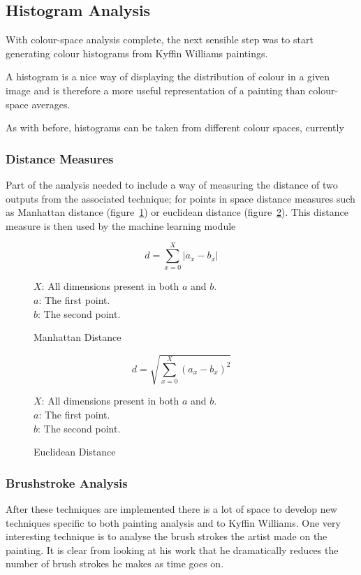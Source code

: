 \documentclass[11pt,fleqn,twoside]{article}
\begin{document}
\subsection{Histogram Analysis}
With colour-space analysis complete, the next sensible step was to start generating colour 
histograms from Kyffin Williams paintings.

A histogram is a nice way of displaying the distribution of colour in a given image and is 
therefore a more useful representation of a painting than colour-space averages.

As with before, histograms can be taken from different colour spaces, currently 


\subsubsection{Distance Measures}
Part of the analysis needed to include a way of measuring the distance of two outputs from the
associated technique; for points in space distance measures such as Manhattan distance 
(figure~\ref{eq:manhattan}) or euclidean distance (figure~\ref{eq:euclidean}). This distance 
measure is then used by the machine learning module

\begin{figure}[p]
\[
d = \sum^X_{x=0}{|a_x - b_x|}
\]

\(X\): All dimensions present in both \(a\) and \(b\).\\
\(a\): The first point.\\
\(b\): The second point.

\caption{Manhattan Distance}
\label{eq:manhattan}
\end{figure}

\begin{figure}[p]
\[
d = \sqrt{\sum^X_{x=0}{(a_x - b_x)^2}}
\]

\(X\): All dimensions present in both \(a\) and \(b\).\\
\(a\): The first point.\\
\(b\): The second point.
\caption{Euclidean Distance}
\label{eq:euclidean}
\end{figure}

\subsubsection{Brushstroke Analysis}
After these techniques are implemented there is a lot of space to develop new techniques specific 
to both painting analysis and to Kyffin Williams. One very interesting technique is to analyse the
brush strokes the artist made on the painting. It is clear from looking at his work that he 
dramatically reduces the number of brush strokes he makes as time goes on. 
\end{document}
